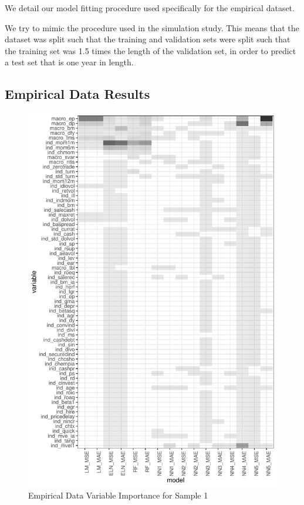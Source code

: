 \documentclass[a4paper, table]{article}
\begin{document}
We detail our model fitting procedure used specifically for the empirical dataset.

We try to mimic the procedure used in the simulation study. This means that the dataset was split such that the training and validation sets were split such that the training set was 1.5 times the length of the validation set, in order to predict a test set that is one year in length.

\subsection{Empirical Data Results}



\begin{figure}
	\includegraphics{empirical_sample_1_vi.pdf}
	\caption{Empirical Data Variable Importance for Sample 1}
\end{figure}
\end{document}
